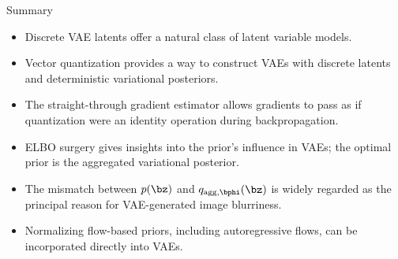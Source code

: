 \documentclass{beamer}
\begin{document}
\begin{frame}{Summary}
	\begin{itemize}
		\item Discrete VAE latents offer a natural class of latent variable models.	
		\vfill
		\item Vector quantization provides a way to construct VAEs with discrete latents and deterministic variational posteriors.
		\vfill
		\item The straight-through gradient estimator allows gradients to pass as if quantization were an identity operation during backpropagation.			
		\vfill
		\item ELBO surgery gives insights into the prior's influence in VAEs; the optimal prior is the aggregated variational posterior. 
		\vfill
		\item The mismatch between $p(\bz)$ and $q_{\text{agg}, \bphi}(\bz)$ is widely regarded as the principal reason for VAE-generated image blurriness.
		\vfill
		\item Normalizing flow-based priors, including autoregressive flows, can be incorporated directly into VAEs.	
	\end{itemize}
\end{frame}
\end{document}
